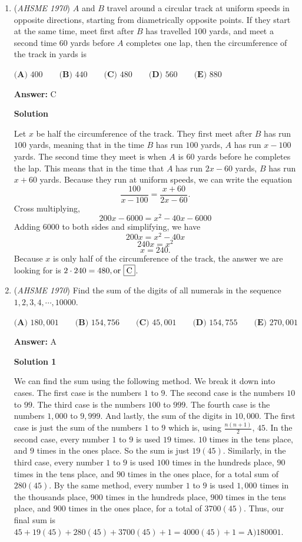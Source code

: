 \begin{enumerate}
	\item (\textit{AHSME 1970}) $A$ and $B$ travel around a circular track at uniform speeds in opposite directions, 
starting from diametrically opposite points. If they start at the same time, 
meet first after $B$ has travelled $100$ yards, and meet a second time $60$ yards before $A$ completes one lap, 
then the circumference of the track in yards is


 $\textbf{(A) }400\qquad \textbf{(B) }440\qquad \textbf{(C) }480\qquad \textbf{(D) }560\qquad  \textbf{(E) }880$

 \textbf{Answer: }C



\textbf{Solution}

Let $x$ be half the circumference of the track. They first meet after $B$ has run $100$ yards, meaning that in the time $B$ has run $100$ yards, $A$ has run $x-100$ yards. The second time they meet is when $A$ is 60 yards before he completes the lap. This means that in the time that $A$ has run $2x-60$ yards, $B$ has run $x+60$ yards. Because they run at uniform speeds, we can write the equation
 \[\frac{100}{x-100}=\frac{x+60}{2x-60} .\]Cross multiplying,
 \[200x-6000=x^2-40x-6000\]Adding $6000$ to both sides and simplifying, we have
 \[200x=x^2-40x\]
 \[240x=x^2\]
 \[x=240.\]Because $x$ is only half of the circumference of the track, the answer we are looking for is $2 \cdot 240 = 480, \text{or } \fbox{C}$.

 


	\item (\textit{AHSME 1970}) Find the sum of the digits of all numerals in the sequence $1,2,3,4,\cdots ,10000$.


 $\textbf{(A) }180,001\qquad \textbf{(B) }154,756\qquad \textbf{(C) }45,001\qquad \textbf{(D) }154,755\qquad  \textbf{(E) }270,001$

 \textbf{Answer: }A



\textbf{Solution 1}

We can find the sum using the following method. We break it down into cases. The first case is the numbers $1$ to $9$. The second case is the numbers $10$ to $99$. The third case is the numbers $100$ to $999$. The fourth case is the numbers $1,000$ to $9,999$. And lastly, the sum of the digits in $10,000$. The first case is just the sum of the numbers $1$ to $9$ which is, using $\frac{n(n+1)}{2}$, $45$. In the second case, every number $1$ to $9$ is used $19$ times. $10$ times in the tens place, and $9$ times in the ones place. So the sum is just $19(45)$. Similarly, in the third case, every number $1$ to $9$ is used  $100$ times in the hundreds place, $90$ times in the tens place, and $90$ times in the ones place, for a total sum of $280(45)$. By the same method, every number $1$ to $9$ is used $1,000$ times in the thousands place, $900$ times in the hundreds place, $900$ times in the tens place, and $900$ times in the ones place, for a total of $3700(45)$. Thus, our final sum is $45+19(45)+280(45)+3700(45)+1=4000(45)+1=\boxed{\text{A)}180001}.$





\end{enumerate}
